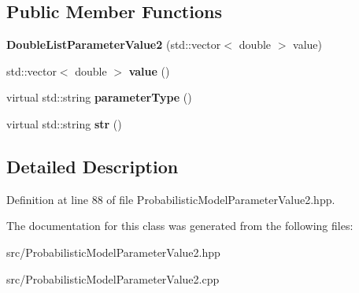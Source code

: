 \subsection*{Public Member Functions}
\begin{DoxyCompactItemize}
\item 
\mbox{\label{classtops_1_1DoubleListParameterValue2_aba397c523171e51c31500540f5dea809}} 
{\bfseries Double\+List\+Parameter\+Value2} (std\+::vector$<$ double $>$ value)
\item 
\mbox{\label{classtops_1_1DoubleListParameterValue2_a9eadec4e5c307d58f7b991ca69e4f2b0}} 
std\+::vector$<$ double $>$ {\bfseries value} ()
\item 
\mbox{\label{classtops_1_1DoubleListParameterValue2_a3ffe1b1b4c3860ce33fec98cd25630df}} 
virtual std\+::string {\bfseries parameter\+Type} ()
\item 
\mbox{\label{classtops_1_1DoubleListParameterValue2_a0dffa07dc65126e7e4de9d9ae09e43d8}} 
virtual std\+::string {\bfseries str} ()
\end{DoxyCompactItemize}


\subsection{Detailed Description}


Definition at line 88 of file Probabilistic\+Model\+Parameter\+Value2.\+hpp.



The documentation for this class was generated from the following files\+:\begin{DoxyCompactItemize}
\item 
src/Probabilistic\+Model\+Parameter\+Value2.\+hpp\item 
src/Probabilistic\+Model\+Parameter\+Value2.\+cpp\end{DoxyCompactItemize}
